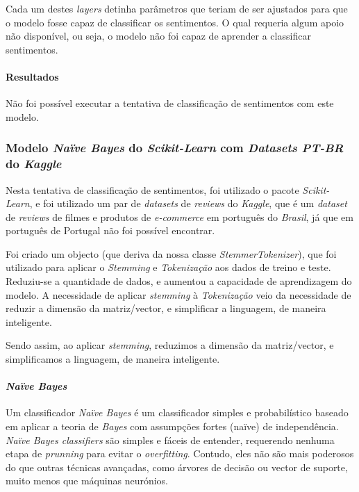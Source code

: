 Cada um destes \textit{layers} detinha parâmetros que teriam de ser ajustados para que o modelo fosse capaz de classificar os sentimentos. O qual requeria algum apoio não disponível, ou seja, o modelo não foi capaz de aprender a classificar sentimentos.

\paragraph{Resultados\\}

Não foi possível executar a tentativa de classificação de sentimentos com este modelo.

\subsubsection{Modelo \textit{Naïve Bayes} do \textit{Scikit-Learn} com \textit{Datasets PT-BR} do \textit{Kaggle}}

Nesta tentativa de classificação de sentimentos, foi utilizado o pacote \textit{Scikit-Learn}, e foi utilizado um par de \textit{datasets} de \textit{reviews} do \textit{Kaggle}, que é um \textit{dataset} de \textit{reviews} de filmes e produtos de \textit{e-commerce} em português do \textit{Brasil}, já que em português de Portugal não foi possível encontrar.

Foi criado um objecto (que deriva da nossa classe \textit{StemmerTokenizer}), que foi utilizado para aplicar o \textit{Stemming} e \textit{Tokenização} aos dados de treino e teste. Reduziu-se a quantidade de dados, e aumentou a capacidade de aprendizagem do modelo. A necessidade de aplicar \textit{stemming} à \textit{Tokenização} veio da necessidade de reduzir a dimensão da matriz/vector, e simplificar a linguagem, de maneira inteligente.

Sendo assim, ao aplicar \textit{stemming}, reduzimos a dimensão da matriz/vector, e simplificamos a linguagem, de maneira inteligente.

\paragraph{\textit{Naïve Bayes}}

Um classificador \textit{Naïve Bayes} é um classificador simples e probabilístico baseado em aplicar a teoria de \textit{Bayes} com assumpções fortes ({naïve}) de independência. \textit{Naïve Bayes classifiers} são simples e fáceis de entender, requerendo nenhuma etapa de \textit{prunning} para evitar o \textit{overfitting}. Contudo, eles não são mais poderosos do que outras técnicas avançadas, como árvores de decisão ou vector de suporte, muito menos que máquinas neurónios.

